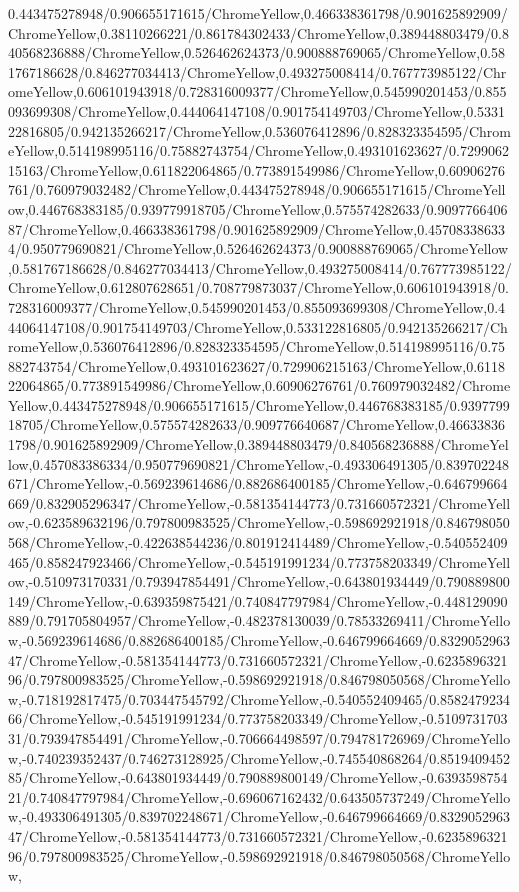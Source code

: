 {\begin{tikzternal}
{0.443475278948/0.906655171615/ChromeYellow,0.466338361798/0.901625892909/ChromeYellow,0.38110266221/0.861784302433/ChromeYellow,0.389448803479/0.840568236888/ChromeYellow,0.526462624373/0.900888769065/ChromeYellow,0.581767186628/0.846277034413/ChromeYellow,0.493275008414/0.767773985122/ChromeYellow,0.606101943918/0.728316009377/ChromeYellow,0.545990201453/0.855093699308/ChromeYellow,0.444064147108/0.901754149703/ChromeYellow,0.533122816805/0.942135266217/ChromeYellow,0.536076412896/0.828323354595/ChromeYellow,0.514198995116/0.75882743754/ChromeYellow,0.493101623627/0.729906215163/ChromeYellow,0.611822064865/0.773891549986/ChromeYellow,0.60906276761/0.760979032482/ChromeYellow,0.443475278948/0.906655171615/ChromeYellow,0.446768383185/0.939779918705/ChromeYellow,0.575574282633/0.909776640687/ChromeYellow,0.466338361798/0.901625892909/ChromeYellow,0.457083386334/0.950779690821/ChromeYellow,0.526462624373/0.900888769065/ChromeYellow,0.581767186628/0.846277034413/ChromeYellow,0.493275008414/0.767773985122/ChromeYellow,0.612807628651/0.708779873037/ChromeYellow,0.606101943918/0.728316009377/ChromeYellow,0.545990201453/0.855093699308/ChromeYellow,0.444064147108/0.901754149703/ChromeYellow,0.533122816805/0.942135266217/ChromeYellow,0.536076412896/0.828323354595/ChromeYellow,0.514198995116/0.75882743754/ChromeYellow,0.493101623627/0.729906215163/ChromeYellow,0.611822064865/0.773891549986/ChromeYellow,0.60906276761/0.760979032482/ChromeYellow,0.443475278948/0.906655171615/ChromeYellow,0.446768383185/0.939779918705/ChromeYellow,0.575574282633/0.909776640687/ChromeYellow,0.466338361798/0.901625892909/ChromeYellow,0.389448803479/0.840568236888/ChromeYellow,0.457083386334/0.950779690821/ChromeYellow,-0.493306491305/0.839702248671/ChromeYellow,-0.569239614686/0.882686400185/ChromeYellow,-0.646799664669/0.832905296347/ChromeYellow,-0.581354144773/0.731660572321/ChromeYellow,-0.623589632196/0.797800983525/ChromeYellow,-0.598692921918/0.846798050568/ChromeYellow,-0.422638544236/0.801912414489/ChromeYellow,-0.540552409465/0.858247923466/ChromeYellow,-0.545191991234/0.773758203349/ChromeYellow,-0.510973170331/0.793947854491/ChromeYellow,-0.643801934449/0.790889800149/ChromeYellow,-0.639359875421/0.740847797984/ChromeYellow,-0.448129090889/0.791705804957/ChromeYellow,-0.482378130039/0.78533269411/ChromeYellow,-0.569239614686/0.882686400185/ChromeYellow,-0.646799664669/0.832905296347/ChromeYellow,-0.581354144773/0.731660572321/ChromeYellow,-0.623589632196/0.797800983525/ChromeYellow,-0.598692921918/0.846798050568/ChromeYellow,-0.718192817475/0.703447545792/ChromeYellow,-0.540552409465/0.858247923466/ChromeYellow,-0.545191991234/0.773758203349/ChromeYellow,-0.510973170331/0.793947854491/ChromeYellow,-0.706664498597/0.794781726969/ChromeYellow,-0.740239352437/0.746273128925/ChromeYellow,-0.745540868264/0.851940945285/ChromeYellow,-0.643801934449/0.790889800149/ChromeYellow,-0.639359875421/0.740847797984/ChromeYellow,-0.696067162432/0.643505737249/ChromeYellow,-0.493306491305/0.839702248671/ChromeYellow,-0.646799664669/0.832905296347/ChromeYellow,-0.581354144773/0.731660572321/ChromeYellow,-0.623589632196/0.797800983525/ChromeYellow,-0.598692921918/0.846798050568/ChromeYellow,
}
\end{tikzternal}}

